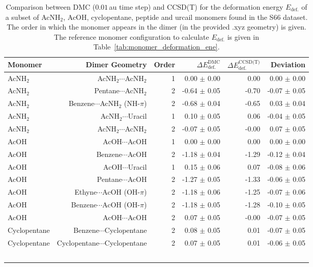 \begin{table}
\caption{\label{tab:monomer_deformation_ene_validation}Comparison between DMC ($0.01\,$au time step) and CCSD(T) for the deformation energy $E_\text{def.}$ of a subset of AcNH$_2$, AcOH, cyclopentane, peptide and urcail monomers found in the S66 dataset. The order in which the monomer appears in the dimer (in the provided .xyz geometry) is given. The reference monomer configuration to calculate $E_\text{def.}$ is given in Table~\ref{tab:monomer_deformation_ene}.}
\begin{adjustbox}{center}
\begin{tabular}{lrrrrr}
\toprule
Monomer & Dimer Geometry & Order & $\Delta E_\text{def.}^\text{DMC}$ & $\Delta E_\text{def.}^\text{CCSD(T)}$ & Deviation \\ 
\midrule
AcNH$_2$ & AcNH$_2$$\cdots$AcNH$_2$ & 1 & 0.00 $\pm$ 0.00 & 0.00 & 0.00 $\pm$ 0.00 \\
AcNH$_2$ & Pentane$\cdots$AcNH$_2$ & 2 & -0.64 $\pm$ 0.05 & -0.70 & -0.07 $\pm$ 0.05 \\
AcNH$_2$ & Benzene$\cdots$AcNH$_2$ (NH-$\pi$) & 2 & -0.68 $\pm$ 0.04 & -0.65 & 0.03 $\pm$ 0.04 \\
AcNH$_2$ & AcNH$_2$$\cdots$Uracil & 1 & 0.10 $\pm$ 0.05 & 0.06 & -0.04 $\pm$ 0.05 \\
AcNH$_2$ & AcNH$_2$$\cdots$AcNH$_2$ & 2 & -0.07 $\pm$ 0.05 & -0.00 & 0.07 $\pm$ 0.05 \\
AcOH & AcOH$\cdots$AcOH & 1 & 0.00 $\pm$ 0.00 & 0.00 & 0.00 $\pm$ 0.00 \\
AcOH & Benzene$\cdots$AcOH & 2 & -1.18 $\pm$ 0.04 & -1.29 & -0.12 $\pm$ 0.04 \\
AcOH & AcOH$\cdots$Uracil & 1 & 0.15 $\pm$ 0.06 & 0.07 & -0.08 $\pm$ 0.06 \\
AcOH & Pentane$\cdots$AcOH & 2 & -1.27 $\pm$ 0.05 & -1.33 & -0.06 $\pm$ 0.05 \\
AcOH & Ethyne$\cdots$AcOH (OH-$\pi$) & 2 & -1.18 $\pm$ 0.06 & -1.25 & -0.07 $\pm$ 0.06 \\
AcOH & Benzene$\cdots$AcOH (OH-$\pi$) & 2 & -1.18 $\pm$ 0.05 & -1.28 & -0.10 $\pm$ 0.05 \\
AcOH & AcOH$\cdots$AcOH & 2 & 0.07 $\pm$ 0.05 & -0.00 & -0.07 $\pm$ 0.05 \\
Cyclopentane & Benzene$\cdots$Cyclopentane & 2 & 0.08 $\pm$ 0.05 & 0.01 & -0.07 $\pm$ 0.05 \\
Cyclopentane & Cyclopentane$\cdots$Cyclopentane & 2 & 0.07 $\pm$ 0.05 & 0.01 & -0.06 $\pm$ 0.05 \\
$$
\end{tabular}
\end{adjustbox}
\end{table}
